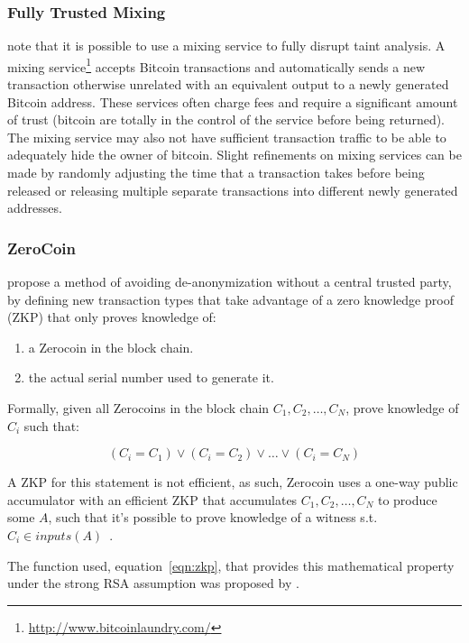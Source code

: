 \subsubsection{Fully Trusted Mixing}
\textcite{eval-priv} note that it is possible to use a mixing service to fully disrupt taint analysis.  A mixing service\footnote{\url{http://www.bitcoinlaundry.com/}} accepts Bitcoin transactions and automatically sends a new transaction otherwise unrelated with an equivalent output to a newly generated Bitcoin address.  These services often charge fees and require a significant amount of trust (bitcoin are totally in the control of the service before being returned).  The mixing service may also not have sufficient transaction traffic to be able to adequately hide the owner of bitcoin. Slight refinements on mixing services can be made by randomly adjusting the time that a transaction takes before being released or releasing multiple separate transactions into different newly generated addresses.

\subsubsection{ZeroCoin}
\textcite{zerocoin} propose a method of avoiding de-anonymization without a central trusted party, by defining new transaction types that take advantage of a zero knowledge proof (ZKP) that only proves knowledge of:

\begin{enumerate}
\item a Zerocoin in the block chain.
\item the actual serial number used to generate it.
\end{enumerate}

Formally, given all Zerocoins in the block chain ${C_1, C_2,\dots,C_N}$, prove knowledge of $C_i$ such that:

\begin{equation}
    (C_i = C_1) \vee (C_i=C_2) \vee \dots \vee (C_i=C_N)
\end{equation}

A ZKP for this statement is not efficient, as such, Zerocoin uses a one-way public accumulator with an efficient ZKP that accumulates ${C_1, C_2,\dots,C_N}$ to produce some $A$, such that it's possible to prove knowledge of a witness s.t. $C_i \in inputs(A)$~\cite{one-way-accumulators}.

The function used, equation~\ref{eqn:zkp}, that provides this mathematical property under the strong RSA assumption was proposed by \textcite{strong-rsa}.

